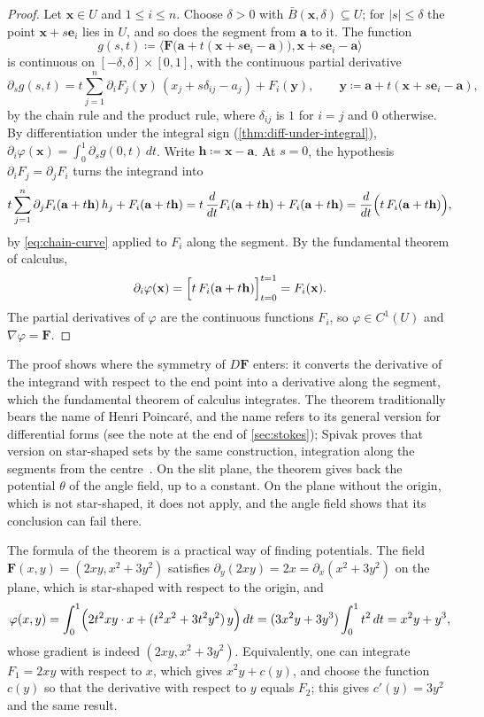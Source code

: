 \begin{proof}
Let $\mathbf x\in U$ and $1\le i\le n$. Choose $\delta>0$ with $\bar B(\mathbf x,\delta)\subseteq U$; for $|s|\le\delta$ the point $\mathbf x+s\mathbf e_i$ lies in $U$, and so does the segment from $\mathbf a$ to it. The function
\[
g(s,t)\coloneqq\bigl\langle\mathbf F\bigl(\mathbf a+t(\mathbf x+s\mathbf e_i-\mathbf a)\bigr),\mathbf x+s\mathbf e_i-\mathbf a\bigr\rangle
\]
is continuous on $[-\delta,\delta]\times[0,1]$, with the continuous partial derivative
\[
\partial_sg(s,t)=t\sum_{j=1}^n\partial_iF_j(\mathbf y)\,(x_j+s\delta_{ij}-a_j)+F_i(\mathbf y),\qquad\mathbf y\coloneqq\mathbf a+t(\mathbf x+s\mathbf e_i-\mathbf a),
\]
by the chain rule and the product rule, where $\delta_{ij}$ is $1$ for $i=j$ and $0$ otherwise. By differentiation under the integral sign (\cref{thm:diff-under-integral}), $\partial_i\varphi(\mathbf x)=\int_0^1\partial_sg(0,t)\,dt$. Write $\mathbf h\coloneqq\mathbf x-\mathbf a$. At $s=0$, the hypothesis $\partial_iF_j=\partial_jF_i$ turns the integrand into
\[
t\sum_{j=1}^n\partial_jF_i(\mathbf a+t\mathbf h)\,h_j+F_i(\mathbf a+t\mathbf h)=t\,\frac d{dt}F_i(\mathbf a+t\mathbf h)+F_i(\mathbf a+t\mathbf h)=\frac d{dt}\Bigl(t\,F_i(\mathbf a+t\mathbf h)\Bigr),
\]
by \eqref{eq:chain-curve} applied to $F_i$ along the segment. By the fundamental theorem of calculus,
\[
\partial_i\varphi(\mathbf x)=\Bigl[t\,F_i(\mathbf a+t\mathbf h)\Bigr]_{t=0}^{t=1}=F_i(\mathbf x).
\]
The partial derivatives of $\varphi$ are the continuous functions $F_i$, so $\varphi\in C^1(U)$ and $\nabla\varphi=\mathbf F$.
\end{proof}

The proof shows where the symmetry of $D\mathbf F$ enters: it converts the derivative of the integrand with respect to the end point into a derivative along the segment, which the fundamental theorem of calculus integrates. The theorem traditionally bears the name of Henri Poincar\'e, and the name refers to its general version for differential forms (see the note at the end of \cref{sec:stokes}); Spivak proves that version on star-shaped sets by the same construction, integration along the segments from the centre~\cite{spivak1965manifolds}. On the slit plane, the theorem gives back the potential $\theta$ of the angle field, up to a constant. On the plane without the origin, which is not star-shaped, it does not apply, and the angle field shows that its conclusion can fail there.

The formula of the theorem is a practical way of finding potentials. The field $\mathbf F(x,y)=(2xy,x^2+3y^2)$ satisfies $\partial_y(2xy)=2x=\partial_x(x^2+3y^2)$ on the plane, which is star-shaped with respect to the origin, and
\[
\varphi(x,y)=\int_0^1\Bigl(2t^2xy\cdot x+(t^2x^2+3t^2y^2)\,y\Bigr)\,dt=(3x^2y+3y^3)\int_0^1t^2\,dt=x^2y+y^3 ,
\]
whose gradient is indeed $(2xy,x^2+3y^2)$. Equivalently, one can integrate $F_1=2xy$ with respect to $x$, which gives $x^2y+c(y)$, and choose the function $c(y)$ so that the derivative with respect to $y$ equals $F_2$; this gives $c'(y)=3y^2$ and the same result.

